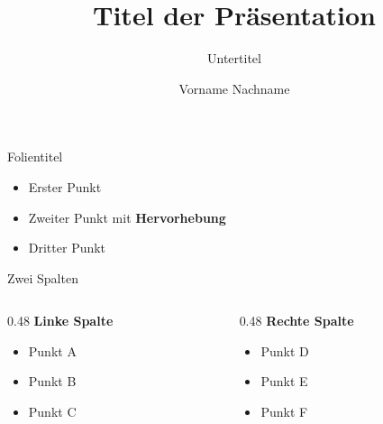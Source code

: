 \documentclass[aspectratio=169]{beamer}
\title{Titel der Präsentation}
\subtitle{Untertitel}
\author{Vorname Nachname}
\institute{}
\date{}
\begin{document}

{
\darkbackground
\begin{frame}
    \titlepage
\end{frame}
}

\begin{frame}{Folientitel}
    \begin{itemize}
        \setlength{\itemsep}{0.8em}
        \item Erster Punkt
        \item Zweiter Punkt mit \textbf{Hervorhebung}
        \item Dritter Punkt
    \end{itemize}
\end{frame}

\begin{frame}{Zwei Spalten}
    \begin{columns}[T]
        \begin{column}{0.48\textwidth}
            \textbf{\color{fillblue} Linke Spalte}\\[0.5em]
            \begin{itemize}
                \item Punkt A
                \item Punkt B
                \item Punkt C
            \end{itemize}
        \end{column}
        \begin{column}{0.48\textwidth}
            \textbf{\color{fillblue} Rechte Spalte}\\[0.5em]
            \begin{itemize}
                \item Punkt D
                \item Punkt E
                \item Punkt F
            \end{itemize}
        \end{column}
    \end{columns}
\end{frame}
\end{document}
